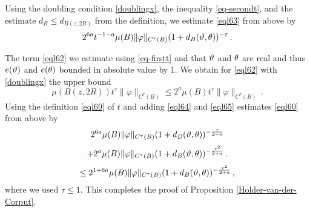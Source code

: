 {Using   the doubling condition \eqref{doublingx},
the inequality \eqref{eq-secondt}, and the estimate
$d_B\le d_{B(z,2R)}$ from the definition,
we estimate \eqref{eql63} from above by
\begin{equation}\label{eql64}
       2^{6a}t^{-1-a} \mu(B) \|{\varphi}\|_{C^\tau(B)}
       (1 + d_{B}({\vartheta},{\theta}))^{-\tau}  \, .
 \end{equation}

The term \eqref{eql62} we estimate using
\eqref{eq-firstt} and that
${\vartheta}$ and ${\theta}$ are real and thus $e({\vartheta})$ and
$e({\theta})$ bounded in absolute value by $1$.
We obtain for \eqref{eql62} with \eqref{doublingx}
the upper bound
  \begin{equation}\label{eql65}
      \mu(B(z,2R)) t^{\tau} \|\varphi\|_{C^\tau(B)}
      \le  2^a \mu(B) t^{\tau} \|\varphi\|_{C^\tau(B)}
      \,.
 \end{equation}
Using the definition \eqref{eql69} of $t$ and adding
\eqref{eql64} and \eqref{eql65} estimates
\eqref{eql60} from above by
\begin{equation}
       2^{6a} \mu(B) \|{\varphi}\|_{C^\tau(B)}
       (1 + d_{B}({\vartheta},{\theta}))^{-\frac{\tau}{2+a}}
       \end{equation}
\begin{equation} +
        2^a \mu(B) \|{\varphi}\|_{C^\tau(B)}
       (1 + d_{B}({\vartheta},{\theta}))^{-\frac{\tau^2}{2+a}}\, .
 \end{equation}
\begin{equation}\label{eql66}
      \le  2^{1+6a} \mu(B) \|{\varphi}\|_{C^\tau(B)}
       (1 + d_{B}({\vartheta},{\theta}))^{-\frac{\tau^2}{2+a}}  \, ,
 \end{equation}
where we used $\tau\le 1$.
This completes the proof of Proposition \ref{Holder-van-der-Corput}.

}
